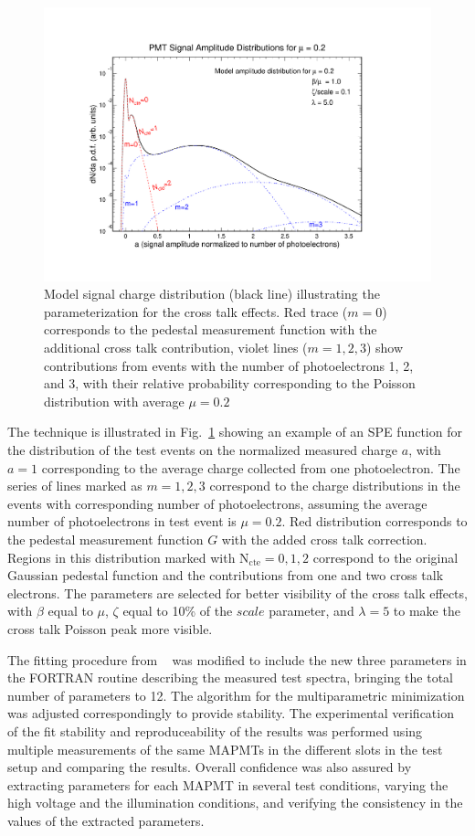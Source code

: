 \begin{figure}[hbt]
	\centering
	\includegraphics[trim=90 60 110 100, clip, width=\linewidth]{figures/model.pdf}
	\caption{Model signal charge distribution (black line) illustrating the parameterization for the cross talk effects. Red trace ($m = 0$) corresponds to the pedestal measurement function with the additional cross talk contribution, violet lines ($m = 1, 2, 3$) show contributions from events with the number of photoelectrons 1, 2, and 3, with their relative probability corresponding to the Poisson distribution with average $\mu = 0.2$  }
	\label{fig:Model}
\end{figure}

The technique is illustrated in Fig.~\ref{fig:Model} showing an example of an SPE function for the distribution of the test events on the normalized measured charge $a$, with $a=1$ corresponding to the average charge collected from one photoelectron. The series of lines marked as $m = 1, 2, 3$ correspond to the charge distributions in the events with corresponding number of photoelectrons, assuming the average number of photoelectrons in test event is $\mu = 0.2$. Red distribution corresponds to the pedestal measurement function $G$ with the added cross talk correction. Regions in this distribution marked with $\mathrm{N_{cte}=0, 1, 2}$ correspond to the original Gaussian pedestal function and the contributions from one and two cross talk electrons. The parameters are selected for better visibility of the cross talk effects, with $\beta$ equal to $\mu$, $\zeta$ equal to 10\% of the $scale$ parameter, and $\lambda = 5$ to make the cross talk Poisson peak more visible.  

The fitting procedure from ~\cite{DEGTIARENKO20171} was modified to include the new three parameters in the FORTRAN routine describing the measured test spectra, bringing the total number of parameters to 12. The algorithm for the multiparametric minimization was adjusted correspondingly to provide stability. The experimental verification of the fit stability and reproduceability of the results was performed using multiple measurements of the same MAPMTs in the different slots in the test setup and comparing the results. Overall confidence was also assured by extracting parameters for each MAPMT in several test conditions, varying the high voltage and the illumination conditions, and verifying the consistency in the values of the extracted parameters. 
